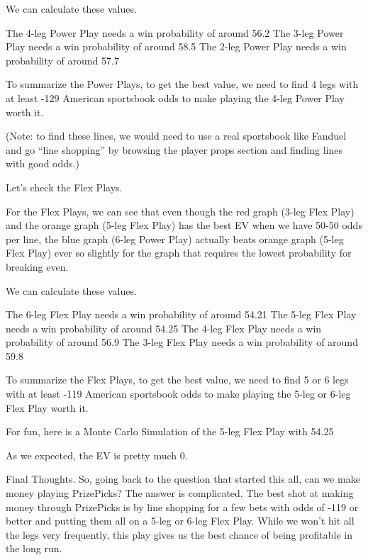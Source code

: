 We can calculate these values.

The 4-leg Power Play needs a win probability of around 56.2%
The 3-leg Power Play needs a win probability of around 58.5%
The 2-leg Power Play needs a win probability of around 57.7%

To summarize the Power Plays, to get the best value, we need to find $4$ legs with at least -129 American sportsbook odds to make playing the 4-leg Power Play worth it.

(Note: to find these lines, we would need to use a real sportsbook like Fanduel and go “line shopping” by browsing the player props section and finding lines with good odds.)








Let’s check the Flex Plays.


For the Flex Plays, we can see that even though the red graph (3-leg Flex Play) and the orange graph (5-leg Flex Play) has the best EV when we have 50-50 odds per line, the blue graph (6-leg Power Play) actually beats orange graph (5-leg Flex Play) ever so slightly for the graph that requires the lowest probability for breaking even.  

We can calculate these values.

The 6-leg Flex Play needs a win probability of around 54.21%
The 5-leg Flex Play needs a win probability of around 54.25%
The 4-leg Flex Play needs a win probability of around 56.9%
The 3-leg Flex Play needs a win probability of around 59.8%

To summarize the Flex Plays, to get the best value, we need to find 5 or 6 legs with at least -119 American sportsbook odds to make playing the 5-leg or 6-leg Flex Play worth it.









For fun, here is a Monte Carlo Simulation of the 5-leg Flex Play with 54.25%


As we expected, the EV is pretty much 0. 

Final Thoughts. So, going back to the question that started this all, can we make money playing PrizePicks? The answer is complicated. The best shot at making money through PrizePicks is by line shopping for a few bets with odds of -119 or better and putting them all on a 5-leg or 6-leg Flex Play. While we won’t hit all the legs very frequently, this play gives us the best chance of being profitable in the long run. 

